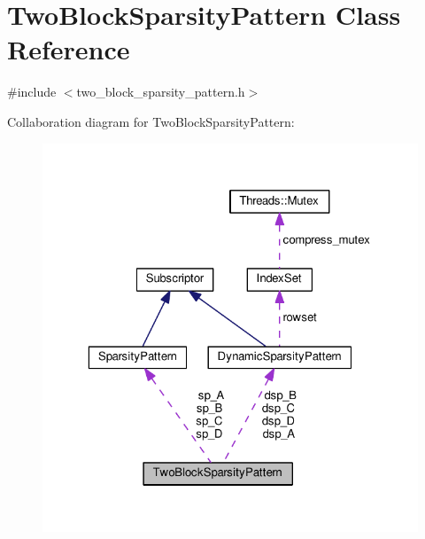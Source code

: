 \hypertarget{class_two_block_sparsity_pattern}{}\section{Two\+Block\+Sparsity\+Pattern Class Reference}
\label{class_two_block_sparsity_pattern}


{\ttfamily \#include $<$two\+\_\+block\+\_\+sparsity\+\_\+pattern.\+h$>$}



Collaboration diagram for Two\+Block\+Sparsity\+Pattern\+:
\nopagebreak
\begin{figure}[H]
\begin{center}
\leavevmode
\includegraphics[width=323pt]{class_two_block_sparsity_pattern__coll__graph}
\end{center}
\end{figure}
